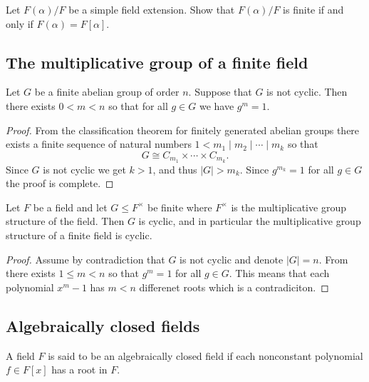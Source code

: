 \documentclass[11pt,a4paper]{article}
\begin{document}
\begin{exercise}
  Let $F(\alpha)/F$ be a simple field extension.
  Show that $F(\alpha)/F$ is finite if and only if $F(\alpha) = F[\alpha]$.
\end{exercise}

\subsection{The multiplicative group of a finite field}

\begin{lemma}
  \label{lem:abelian-groups}
  Let $G$ be a finite abelian group of order $n$.
  Suppose that $G$ is not cyclic.
  Then there exists $0 < m < n$ so that for all $g \in G$ we have
  $g^m = 1$.
\end{lemma}
\begin{proof}
  From the classification theorem for finitely generated abelian groups
  there exists a finite sequence of natural numbers
  $1 < m_1 \mid m_2 \mid \cdots \mid m_k$ so that
  \[
    G \cong C_{m_1} \times \cdots \times C_{m_k}.
  \]
  Since $G$ is not cyclic we get $k > 1$, and thus $|G| > m_k$.
  Since $g^{m_k} = 1$ for all $g \in G$ the proof is complete.
\end{proof}

\begin{corollary}
  \label{cor:multiplicative-group-of-finite-field-is-cyclic}
  Let $F$ be a field and let $G \leqslant F^{\times}$ be finite
  where $F^{\times}$ is the multiplicative group structure of the field.
  Then $G$ is cyclic, and in particular the multiplicative group structure
  of a finite field is cyclic.
\end{corollary}
\begin{proof}
  Assume by contradiction that $G$ is not cyclic and denote $|G| = n$.
  From  there exists $1 \le m < n$ so that
  $g^m = 1$ for all $g \in G$.
  This means that each polynomial $x^m - 1$ has $m < n$ differenet roots
  which is a contradiciton.
\end{proof}

\subsection{Algebraically closed fields}

\begin{definition}
  A field $F$ is said to be an algebraically closed field if each
  nonconstant polynomial $f \in F[x]$ has a root in $F$.
\end{definition}
\end{document}
